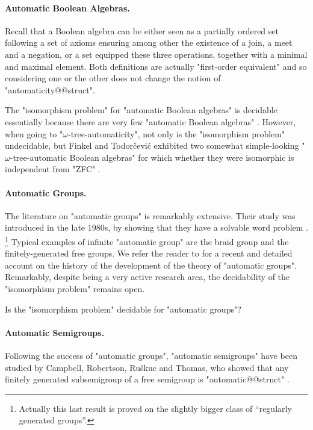 \paragraph*{Automatic Boolean Algebras.}
Recall that a Boolean algebra can be either seen as a partially ordered set
following a set of axioms ensuring among other the existence of a join, a meet
and a negation, or a set equipped these three operations, together with a minimal and maximal 
element. Both definitions are actually "first-order equivalent" and so considering one
or the other does not change the notion of "automaticity@@struct".

The "isomorphism problem" for "automatic Boolean algebras" is decidable
\cite[Corollary~3.5]{KhoussainovNiesRubinStephan2007Automatic} essentially
because there are very few "automatic Boolean algebras" \cite[Theorem~3.4]{KhoussainovNiesRubinStephan2007Automatic}.
However, when going to "$\omega$-tree-automaticity", not only is the "isomorphism problem"
undecidable, but Finkel and Todor\v{c}ević exhibited two somewhat simple-looking
"$\omega$-tree-automatic Boolean algebras" for which whether they were isomorphic
is independent from "ZFC" \cite[Theorem~6.1]{FinkelTodorcevic2010Isomorphism}.

\paragraph*{Automatic Groups.}
The literature on "automatic groups" is remarkably extensive.
Their study was introduced in the late 1980s,
by showing that they have a solvable word problem \cite[Theorem~2.1.9]{Epstein1992Word}.%
\footnote{Actually this last result is proved on the slightly bigger class of ``regularly generated groups''.}
Typical examples of infinite "automatic group" are the braid group
\cite[Theorem~9.3.1]{Epstein1992Word} and the finitely-generated free groups.
We refer the reader to \cite{Rees2022AutomaticGroups} for a recent and detailed account on
the history of the development of the theory of "automatic groups".
Remarkably, despite being a very active research area, the decidability of
the "isomorphism problem" remains open.

\begin{openproblem}
	Is the "isomorphism problem" decidable for "automatic groups"?
\end{openproblem}

\paragraph*{Automatic Semigroups.}
Following the success of "automatic groups",
"automatic semigroups" have been studied by Campbell,
Robertson, Ru\v{s}kuc and Thomas, who showed
that any finitely generated subsemigroup of a free semigroup
is "automatic@@struct"
\cite[Theorem~8.1]{CampbellRobertsonRuskucThomas2001AutomaticSemigroups}.

